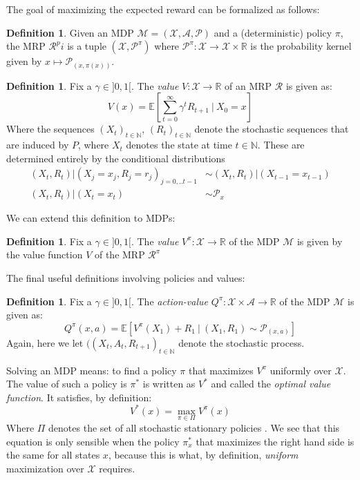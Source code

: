 \documentclass{article}
\theoremstyle{definition}
\newtheorem{definition}[theorem]{Definition}
\theoremstyle{remark}
\newcommand{\mar}{\mathcal{M}}
\newcommand{\stat}{\mathcal{X}}
\newcommand{\act}{\mathcal{A}}
\newcommand{\prob}{\mathcal{P}}
\newcommand{\N}{\mathbb{N}}
\newcommand{\R}{\mathbb{R}}
\begin{document}
The goal of maximizing the expected reward can be formalized as follows:

\begin{definition} Given an MDP $\mar=(\stat,\act,\prob)$ and a (deterministic) policy $\pi$, the MRP $\mathcal{R}^pi$ is a tuple $(\stat, \prob^\pi)$ where $\prob^\pi:\stat\rightarrow \stat\times\R$ is the probability kernel given by $x\mapsto \prob_{(x,\pi(x))}$.
\end{definition}

\begin{definition} Fix a $\gamma \in ]0,1[$. The \emph{value} $V:\stat \rightarrow \R$ of an MRP $\mathcal{R}$ is given as:
\begin{equation}
V(x) = \mathbb{E}\left[ \sum_{t=0}^\infty \gamma^tR_{t+1} \ \vert \ X_0  = x\right]
\end{equation}
Where the sequences $(X_t)_{t\in\N}$, $(R_t)_{t\in\N}$ denote the stochastic sequences that are induced by $P$, where $X_t$ denotes the state at time $t\in\N$. These are determined entirely by the conditional distributions
\begin{align*}
    (X_t,R_t)|(X_j=x_j,R_j=r_j)_{j=0,..t-1}  &\sim (X_t,R_t)|(X_{t-1}=x_{t-1}) \\ (X_t,R_t)|(X_t=x_t) &\sim \prob_x
\end{align*}
\end{definition}

We can extend this definition to MDPs:

\begin{definition}
Fix a $\gamma \in ]0,1[$. The \emph{value} $V^\pi:\stat \rightarrow \R$ of the MDP $\mathcal{M}$ is given by
the value function $V$ of the MRP $\mathcal{R}^\pi$
\end{definition}

The final useful definitions involving policies and values:

\begin{definition}
Fix a $\gamma \in ]0,1[$. The \emph{action-value} $Q^\pi:\stat \times \act \rightarrow \R$ of the MDP $\mathcal{M}$ is given as:
\begin{equation}
Q^\pi(x,a) = \mathbb{E}\left[ V^\pi (X_1) + R_1 \ \vert \ (X_1,R_1) \sim \prob_{(x,a)}\right]
\end{equation}
Again, here we let $((X_t,A_t,R_{t+1})_{t\in \mathbb{N}}$ denote the stochastic process.
\end{definition}

Solving an MDP means: to find a policy $\pi$ that maximizes $V^\pi$ uniformly over $\stat$. The value of such a policy is $\pi^*$ is written as $V^*$ and called the \textit{optimal value function}. It satisfies, by definition:
\begin{equation}
  V^*(x) = \max_{\pi\in\Pi} V^\pi(x)  
\end{equation}
Where $\Pi$ denotes the set of all stochastic stationary policies \cite{Szepesvari2010}. We see that this equation is only sensible when the policy $\pi^*_x$ that maximizes the right hand side is the same for all states $x$, because this is what, by definition, \textit{uniform} maximization over $\stat$ requires. 
\end{document}
